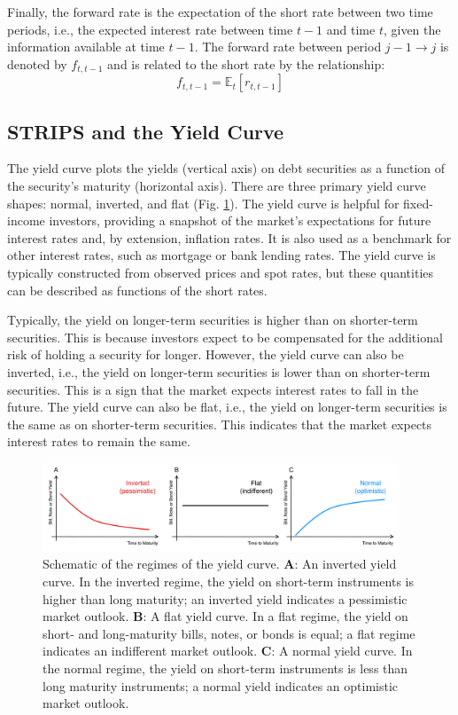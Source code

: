 \documentclass[11pt]{article}
\theoremstyle{definition}
\begin{document}
Finally, the forward rate is the expectation of the short rate between two time periods, i.e., the expected interest rate between time $t-1$ and time $t$, given the information available at time $t-1$. 
The forward rate between period $j-1\rightarrow{j}$ is denoted by $f_{t,t-1}$ and is related to the short rate by the relationship:
\begin{equation}
	f_{t,t-1} = \mathbb{E}_{t}\left[r_{t,t-1}\right]
\end{equation}

\subsection{STRIPS and the Yield Curve}
The yield curve plots the yields (vertical axis) on debt securities as a function of the security's maturity (horizontal axis). 
There are three primary yield curve shapes: normal, inverted, and flat (Fig. \ref{fig:yield-curve-schematic}).
The yield curve is helpful for fixed-income investors, providing a snapshot of the market's expectations for future interest rates and, by extension, inflation rates. It is also used as a benchmark for other interest rates, such as mortgage or bank lending rates. The yield curve is typically constructed from observed prices and spot rates, but these quantities can be described as functions of the short rates. 

Typically, the yield on longer-term securities is higher than on shorter-term securities. This is because investors expect to be compensated for the additional risk of holding a security for longer. However, the yield curve can also be inverted, i.e., the yield on longer-term securities is lower than on shorter-term securities. This is a sign that the market expects interest rates to fall in the future. The yield curve can also be flat, i.e., the yield on longer-term securities is the same as on shorter-term securities. This indicates that the market expects interest rates to remain the same.

\begin{figure}[h]
    \centering
    \includegraphics[width=0.95\textwidth]{./figs/Fig-YieldCurve-Schematic.pdf}
    \caption{Schematic of the regimes of the yield curve. 
	\textbf{A}: An inverted yield curve. In the inverted regime, the yield on short-term instruments is higher than long maturity; an inverted yield indicates a pessimistic market outlook.
	\textbf{B}: A flat yield curve. In a flat regime, the yield on short- and long-maturity bills, notes, or bonds is equal; a flat regime indicates an indifferent market outlook. 
	\textbf{C}: A normal yield curve. In the normal regime, the yield on short-term instruments is less than long maturity instruments; a normal yield indicates an optimistic market outlook. 
	}\label{fig:yield-curve-schematic}
\end{figure}
\end{document}
